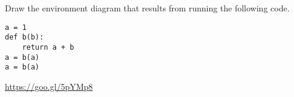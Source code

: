 \begin{blocksection}
\question Draw the environment diagram that results from running the following code.

\begin{lstlisting}
a = 1
def b(b):
    return a + b
a = b(a)
a = b(a)
\end{lstlisting}

\begin{solution}[2in]
\url{https://goo.gl/5pYMp8}
\end{solution}
\end{blocksection}
